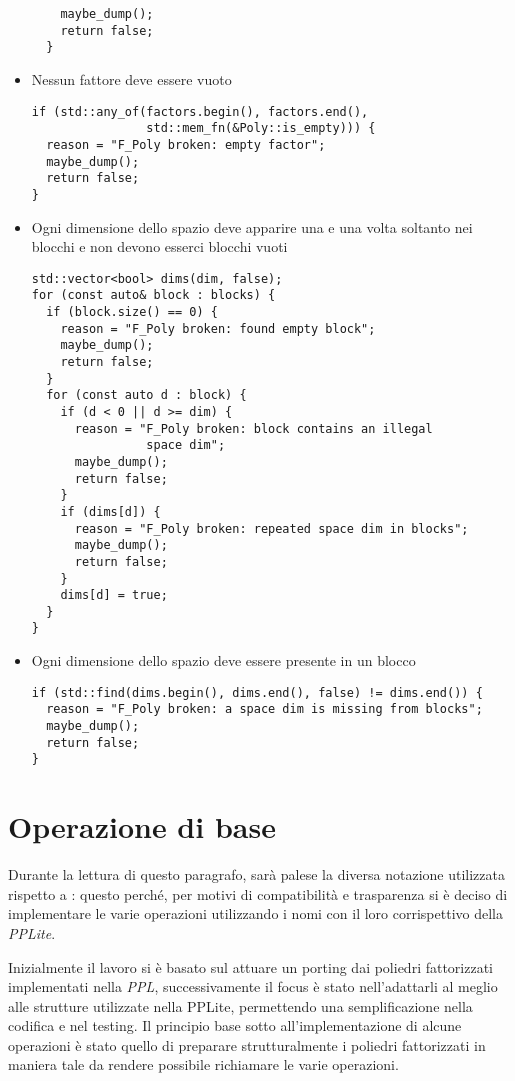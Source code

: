 \documentclass{mimosis}
\theoremstyle{definition}
\begin{document}
\begin{itemize}
\begin{verbatim}
    maybe_dump();
    return false;
  }
\end{verbatim}
\item Nessun fattore deve essere vuoto
\begin{verbatim}
if (std::any_of(factors.begin(), factors.end(),
                std::mem_fn(&Poly::is_empty))) {
  reason = "F_Poly broken: empty factor";
  maybe_dump();
  return false;
}
\end{verbatim}
\item Ogni dimensione dello spazio deve apparire una e una volta soltanto nei
blocchi e non devono esserci blocchi vuoti
\begin{verbatim}
std::vector<bool> dims(dim, false);
for (const auto& block : blocks) {
  if (block.size() == 0) {
    reason = "F_Poly broken: found empty block";
    maybe_dump();
    return false;
  }
  for (const auto d : block) {
    if (d < 0 || d >= dim) {
      reason = "F_Poly broken: block contains an illegal
                space dim";
      maybe_dump();
      return false;
    }
    if (dims[d]) {
      reason = "F_Poly broken: repeated space dim in blocks";
      maybe_dump();
      return false;
    }
    dims[d] = true;
  }
}
\end{verbatim}
\item Ogni dimensione dello spazio deve essere presente in un blocco
\begin{verbatim}
if (std::find(dims.begin(), dims.end(), false) != dims.end()) {
  reason = "F_Poly broken: a space dim is missing from blocks";
  maybe_dump();
  return false;
}
\end{verbatim}
\end{itemize}

\section{Operazione di base}
\label{sec:orgb9c01da}
Durante la lettura di questo paragrafo, sarà palese la diversa notazione
utilizzata rispetto a \cite{fastpoly}: questo perché, per motivi di
compatibilità e trasparenza si è deciso di implementare le varie operazioni
utilizzando i nomi con il loro corrispettivo della \emph{PPLite}.

Inizialmente il lavoro si è basato sul attuare un porting dai poliedri
fattorizzati implementati nella \emph{PPL}, successivamente il focus è stato
nell'adattarli al meglio alle strutture utilizzate nella PPLite, permettendo una
semplificazione nella codifica e nel testing. Il principio base
sotto all'implementazione di alcune operazioni è stato quello di preparare
strutturalmente i poliedri fattorizzati in maniera tale da rendere possibile
richiamare le varie operazioni.
\end{document}
